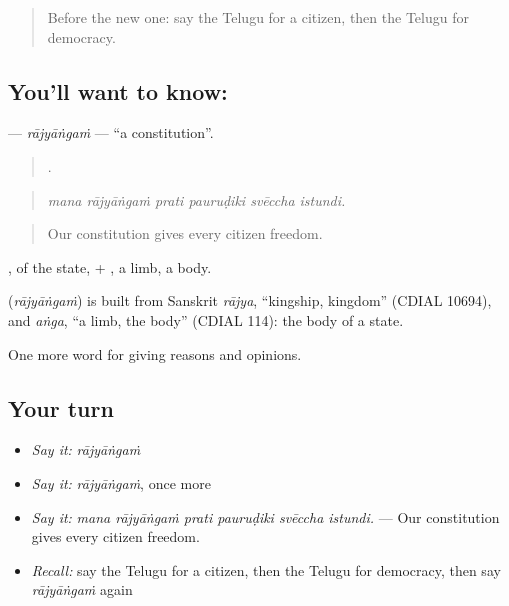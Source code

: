 \label{lesson:TE-C401-rajyangam}



\begin{quote}
Before the new one: say the Telugu for a citizen, then the Telugu for democracy.
\end{quote}

\subsection*{You'll want to know: }
\textbf{} — \emph{rājyāṅgaṁ} — \textquotedblleft{}a constitution\textquotedblright{}.

\begin{quote}
     .
\end{quote}

\begin{quote}
\emph{mana rājyāṅgaṁ prati pauruḍiki svēccha istundi.}
\end{quote}

\begin{quote}
Our constitution gives every citizen freedom.
\end{quote}

, of the state, + , a limb, a body.

\begin{cousinweb}
\textbf{} (\emph{rājyāṅgaṁ}) is built from Sanskrit \emph{rājya}, \textquotedblleft{}kingship, kingdom\textquotedblright{} (CDIAL 10694), and \emph{aṅga}, \textquotedblleft{}a limb, the body\textquotedblright{} (CDIAL 114): the body of a state.
\end{cousinweb}

\begin{grammarlens}[title={What you've built}]
One more word for giving reasons and opinions.
\end{grammarlens}

\subsection*{Your turn}
\begin{itemize}
\raggedright
  \item \emph{Say it:} \emph{rājyāṅgaṁ}
  \item \emph{Say it:} \emph{rājyāṅgaṁ}, once more
  \item \emph{Say it:} \emph{mana rājyāṅgaṁ prati pauruḍiki svēccha istundi.} — Our constitution gives every citizen freedom.
  \item \emph{Recall:} say the Telugu for a citizen, then the Telugu for democracy, then say \emph{rājyāṅgaṁ} again
\end{itemize}

